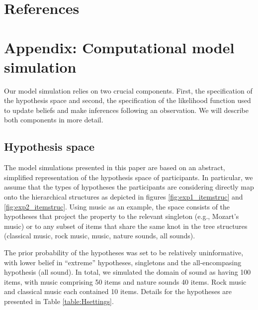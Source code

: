 \documentclass[authoryear,11pt]{elsarticle}
\begin{document}
\section{References}





\appendix

\section*{ Appendix: Computational model simulation}

Our model simulation relies on two crucial components. First, the specification of the hypothesis space and second, the specification of the likelihood function used to update beliefs and make inferences following an observation. We will describe both components in more detail.

\subsection*{Hypothesis space}
The model simulations presented in this paper are based on an abstract, simplified representation of the hypothesis space of participants. In particular, we assume that the types of hypotheses the participants are considering directly map onto the hierarchical structures as depicted in figures \ref{fig:exp1_itemstruc} and \ref{fig:exp2_itemstruc}. Using music as an example, the space consists of the hypotheses that project the property to the relevant singleton (e.g., Mozart's music) or to any subset of items that share the same knot in the tree structures (classical music, rock music, music, nature sounds, all sounds).

The prior probability of the hypotheses was set to be relatively uninformative, with lower belief in ``extreme'' hypotheses, singletons and the all-encompasing hypothesis (all sound). In total, we simulated the domain of sound as having 100 items, with music comprising 50 items and nature sounds 40 items. Rock music and classical music each contained 10 items. Details for the hypotheses are presented in Table \ref{table:Hsettings}.
\end{document}
